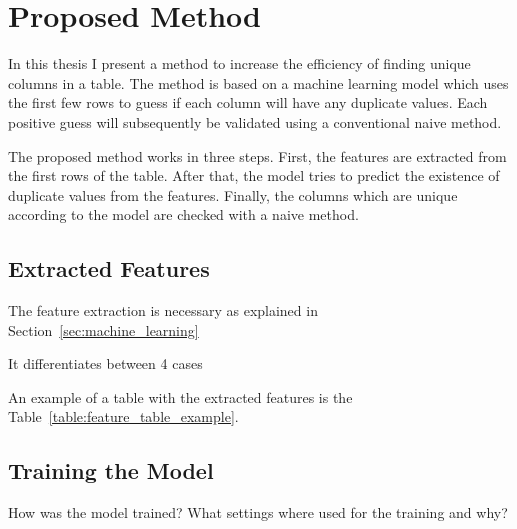 \chapter{Proposed Method}\label{chap:proposed_method}
In this thesis I present a method to increase the efficiency of finding unique columns in a table. The method is based on a machine learning model which uses the first few rows to guess if each column will have any duplicate values. Each positive guess will subsequently be validated using a conventional naive method.

The proposed method works in three steps. First, the features are extracted from the first rows of the table. After that, the model tries to predict the existence of duplicate values from the features. Finally, the columns which are unique according to the model are checked with a naive method.

\section{Extracted Features}\label{sec:extracted_features} %
The feature extraction is necessary as explained in Section~\ref{sec:machine_learning}

It differentiates between 4 cases

An example of a table with the extracted features is the Table~\ref{table:feature_table_example}.

\section{Training the Model}\label{sec:traing_the_model} %
How was the model trained? What settings where used for the training and why?